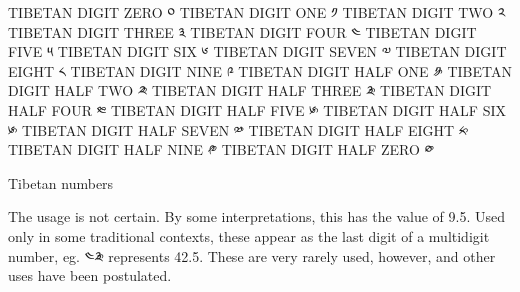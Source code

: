 {
\obeylines
\small
TIBETAN DIGIT ZERO	༠
TIBETAN DIGIT ONE	༡	
TIBETAN DIGIT TWO	༢	
TIBETAN DIGIT THREE	༣	
TIBETAN DIGIT FOUR	༤	
TIBETAN DIGIT FIVE	༥	
TIBETAN DIGIT SIX	༦	
TIBETAN DIGIT SEVEN	༧	
TIBETAN DIGIT EIGHT	༨	
TIBETAN DIGIT NINE	༩	
TIBETAN DIGIT HALF ONE	\tibetan༪	
TIBETAN DIGIT HALF TWO	༫	
TIBETAN DIGIT HALF THREE	༬
TIBETAN DIGIT HALF FOUR ༭	
TIBETAN DIGIT HALF FIVE ༯	
TIBETAN DIGIT HALF SIX	 ༯	
TIBETAN DIGIT HALF SEVEN	༰	
TIBETAN DIGIT HALF EIGHT	༱	
TIBETAN DIGIT HALF NINE	༲	
TIBETAN DIGIT HALF ZERO	༳	
}


Tibetan numbers

The usage is not certain. By some interpretations, this has the value of 9.5. Used only in some traditional contexts, these appear as the last digit of a multidigit number, eg. ༤༬ represents 42.5. These are very rarely used, however, and other uses have been postulated.



